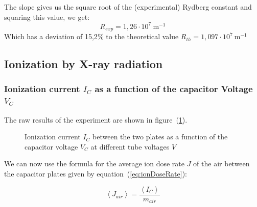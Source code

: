 \documentclass{scrartcl}
\begin{document}
\noindent The slope gives us the square root of the (experimental) Rydberg constant and squaring this value, we get:
\[\boxed{R_{exp} = 1,26 \cdot 10^7 \ \text{m}^{-1}}\]
Which has a deviation of 15,2$\%$ to the theoretical value $R_{th} = 1,097 \cdot 10^7 \ \text{m}^{-1}$

\subsection{Ionization by X-ray radiation}

\subsubsection{Ionization current $I_C$ as a function of the capacitor Voltage $V_C$}

\noindent The raw results of the experiment are shown in figure~(\ref{fig:IonizationCurrentAsFunctionOfCapacitorVoltage}).
\begin{figure}[!ht]
    \centering
    \caption{Ionization current $I_C$ between the two plates as a function of the capacitor voltage $V_C$ at different tube voltages $V$}
    \label{fig:IonizationCurrentAsFunctionOfCapacitorVoltage}
\end{figure}
\FloatBarrier

\noindent We can now use the formula for the average ion dose rate $J$ of the air between the capacitor plates given by equation~(\ref{eq:ionDoseRate}):

\begin{equation}
    \left< J_{air} \right> = \frac{ \left< I_C \right>}{m_{air}}
    \label{eq:ionDoseRate}
\end{equation} 
\end{document}
